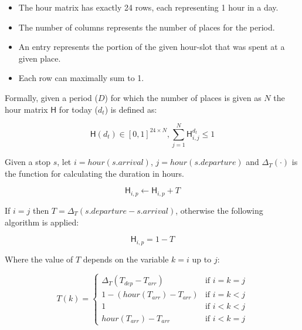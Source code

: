 \begin{itemize}
    \item The hour matrix has exactly 24 rows, each representing 1 hour in a day.
    \item The number of columns represents the number of places for the period. 
    \item An entry represents the portion of the given hour-slot that was spent at a given place.
    \item Each row can maximally sum to 1.
\end{itemize}

Formally, given a period ($D$) for which the number of places is given as $N$ the hour matrix $\mathsf{H}$ for today ($d_t$) is defined as:

\begin{equation}
\label{eq:feature-hour-matrix-def}
\mathsf{H}(d_t) \in [0,1]^{24 \times N}, \sum_{j=1}^N \mathsf{H}^{d_t}_{i,j} \leq 1
\end{equation}

Given a stop $s$, let $i = hour(s.arrival)$, $j = hour(s.departure)$ and $\Delta_ T(\cdot)$ is the function for calculating the duration in hours.

\begin{equation}
\label{eq:feature-hour-matrix-computation}
\mathsf{H}_{i,p} \leftarrow \mathsf{H}_{i,p} + T
\end{equation}

If $i = j$ then $T = \Delta_T (s.departure - s.arrival)$, otherwise the following algorithm is applied:

\begin{equation}
\label{eq:feature-hour-computaion2}
\mathsf{H}_{i,p} = 1 - T
\end{equation}

Where the value of $T$ depends on the variable $k = i$ up to $j$:

\begin{equation}
\label{eq:feature-hour-computaion3}
T(k) =
\begin{cases}
    \Delta_T (T_{dep} - T_{arr})    & \text{if $i = k = j$} \\
    1 - (hour(T_{arr}) - T_{arr})   & \text{if $i = k < j$} \\
    1                               & \text{if $i < k < j$} \\
    hour(T_{arr}) - T_{arr}         & \text{if $i < k = j$}
\end{cases}
\end{equation}


